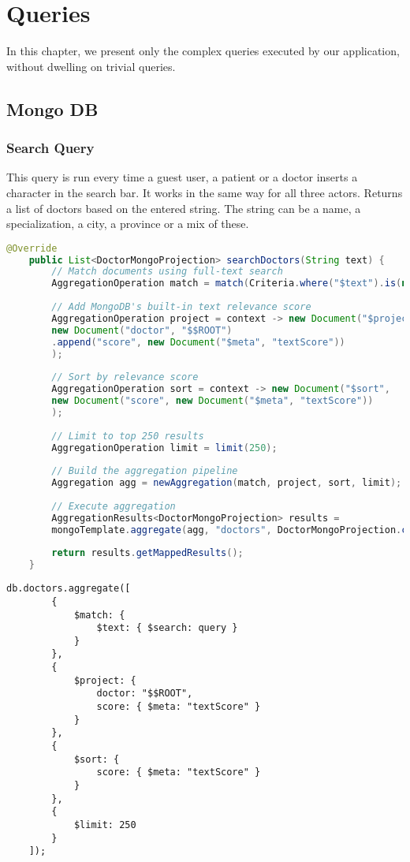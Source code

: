 \chapter{Queries}
In this chapter, we present only the complex queries executed by our application, without dwelling on trivial queries. 

\section{Mongo DB}
\subsection{Search Query}
This query is run every time a guest user, a patient or a doctor inserts a character in the search bar. It works in the same way for all three actors. Returns a list of doctors based on the entered string. The string can be a name, a specialization, a city, a province or a mix of these. 

\begin{lstlisting}[language=java]
	@Override
	public List<DoctorMongoProjection> searchDoctors(String text) {
		// Match documents using full-text search
		AggregationOperation match = match(Criteria.where("$text").is(new Document("$search", text)));
		
		// Add MongoDB's built-in text relevance score
		AggregationOperation project = context -> new Document("$project",
		new Document("doctor", "$$ROOT")
		.append("score", new Document("$meta", "textScore"))
		);
		
		// Sort by relevance score
		AggregationOperation sort = context -> new Document("$sort",
		new Document("score", new Document("$meta", "textScore"))
		);
		
		// Limit to top 250 results
		AggregationOperation limit = limit(250);
		
		// Build the aggregation pipeline
		Aggregation agg = newAggregation(match, project, sort, limit);
		
		// Execute aggregation
		AggregationResults<DoctorMongoProjection> results =
		mongoTemplate.aggregate(agg, "doctors", DoctorMongoProjection.class);
		
		return results.getMappedResults();
	}
\end{lstlisting}

\begin{lstlisting}[language=mongodb]
	db.doctors.aggregate([
		{
			$match: {
				$text: { $search: query }
			}
		},
		{
			$project: {
				doctor: "$$ROOT",
				score: { $meta: "textScore" }
			}
		},
		{
			$sort: {
				score: { $meta: "textScore" }
			}
		},
		{
			$limit: 250
		}
	]);
\end{lstlisting}

